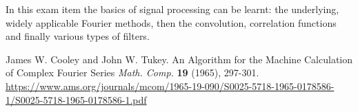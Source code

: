 \documentclass[12pt]{article}
\theoremstyle{plain}
\begin{document}
In this exam item the basics of signal processing can be learnt: the underlying, widely applicable Fourier methods, then the convolution, correlation functions and finally various types of filters. 

\vfill

\begin{thebibliography}{Nature}
%

\hypertarget{James W. Cooley and John W. Tukey (1965)}{}
James W. Cooley and John W. Tukey. An Algorithm for the Machine Calculation of Complex Fourier Series \textit{Math. Comp.} \textbf{19} (1965), 297-301. \url{https://www.ams.org/journals/mcom/1965-19-090/S0025-5718-1965-0178586-1/S0025-5718-1965-0178586-1.pdf}

\end{thebibliography}
\end{document}
